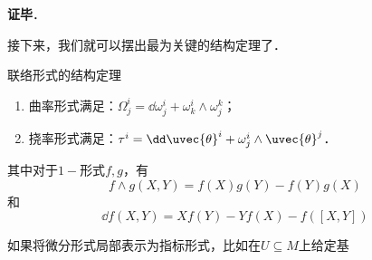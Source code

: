 \textbf{证毕}．

接下来，我们就可以摆出最为关键的结构定理了．

\begin{theorem}{联络形式的结构定理}
\begin{enumerate}
\item 曲率形式满足：$\Omega^i_j=\dd \omega^i_j+\omega^i_k\wedge\omega^k_j$；
\item 挠率形式满足：$\tau^i=\dd\uvec{\theta}^i+\omega^i_j\wedge\uvec{\theta}^j$．
\end{enumerate}

其中对于$1-$形式$f, g$，有
\begin{equation}
f\wedge g(X, Y)=f(X)g(Y)-f(Y)g(X)
\end{equation}
和
\begin{equation}
\dd f(X, Y)=Xf(Y)-Yf(X)-f([X, Y])
\end{equation}

如果将微分形式局部表示为指标形式，比如在$U\subseteq M$上给定基$$
\end{theorem}













